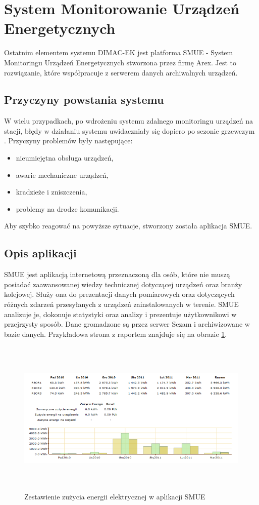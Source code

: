 \section{System Monitorowanie Urządzeń Energetycznych}
Ostatnim elementem systemu DIMAC-EK jest platforma SMUE - System Monitoringu Urządzeń Energetycznych stworzona przez firmę Arex. Jest to rozwiązanie, które współpracuje z serwerem danych archiwalnych urządzeń\cite{dimacek-wytyczne}. 

\subsection{Przyczyny powstania systemu}
W wielu przypadkach, po wdrożeniu systemu zdalnego monitoringu urządzeń na stacji, błędy w działaniu systemu uwidaczniały się dopiero po sezonie grzewczym \cite{dimacek-wytyczne}. Przyczyny problemów były następujące:
\begin{itemize}
\item nieumiejętna obsługa urządzeń,
\item awarie mechaniczne urządzeń,
\item kradzieże i zniszczenia,
\item problemy na drodze komunikacji.
\end{itemize}

Aby szybko reagować na powyższe sytuacje, stworzony została aplikacja SMUE.

\subsection{Opis aplikacji}
SMUE jest aplikacją internetową przeznaczoną dla osób, które nie muszą posiadać zaawansowanej wiedzy technicznej dotyczącej urządzeń oraz branży kolejowej\cite{dimacek-wytyczne}. Służy ona do prezentacji danych pomiarowych oraz dotyczących różnych zdarzeń przesyłanych z urządzeń zainstalowanych w terenie. SMUE analizuje je, dokonuje statystyki oraz analizy i prezentuje użytkownikowi w przejrzysty sposób. Dane gromadzone są  przez serwer Sezam i archiwizowane w bazie danych. Przykładowa strona z raportem znajduje się na obrazie \ref{fig:smue}.\\

\begin{figure}[h]
		\centerline{\includegraphics[height=75mm]{./img/smue.png}}
		\caption{Zestawienie zużycia energii elektrycznej w aplikacji SMUE}
		\label{fig:smue}
\end{figure}

